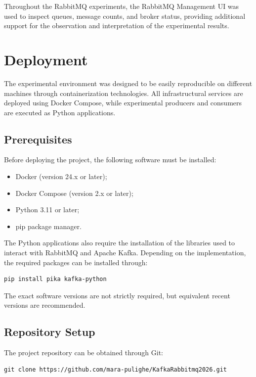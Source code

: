 \documentclass{scrartcl}
\begin{document}
Throughout the RabbitMQ experiments, the RabbitMQ Management UI was used to inspect queues, message counts, and broker status, providing additional support for the observation and interpretation of the experimental results.

\section{Deployment}\label{deployment}

The experimental environment was designed to be easily reproducible on different machines through containerization technologies. All infrastructural services are deployed using Docker Compose, while experimental producers and consumers are executed as Python applications.

\subsection{Prerequisites}

Before deploying the project, the following software must be installed:

\begin{itemize}
\item Docker (version 24.x or later);
\item Docker Compose (version 2.x or later);
\item Python 3.11 or later;
\item pip package manager.
\end{itemize}

The Python applications also require the installation of the libraries used to interact with RabbitMQ and Apache Kafka. Depending on the implementation, the required packages can be installed through:

\begin{verbatim}
pip install pika kafka-python
\end{verbatim}

The exact software versions are not strictly required, but equivalent recent versions are recommended.

\subsection{Repository Setup}

The project repository can be obtained through Git:

\begin{verbatim}
git clone https://github.com/mara-pulighe/KafkaRabbitmq2026.git

\end{verbatim}
\end{document}
